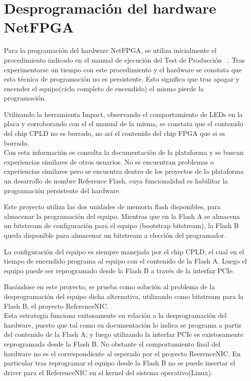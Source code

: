 \section{Desprogramaci\'on del hardware NetFPGA}
\label{apendiceB2}

Para la programación del hardware NetFPGA, se utiliza inicialmente el procedimiento indicado en el manual de ejecuci\'on del Test de Producci\'on ~\citep{ProdTestManual}. Tras experimentarse un tiempo con este procedimiento y el hardware se constata que esta técnica de programación no es persistente. Esto significa que tras apagar y encender el equipo(ciclo completo de encendido) el mismo pierde la programación. 

Utilizando la herramienta Impact, observando el comportamiento de LEDs en la placa y corroborando con el el manual de la misma, se constata que el contenido del chip CPLD no es borrado, no así el contenido del chip FPGA que si es borrado.\\

Con esta información se consulta la documentación de la plataforma y se buscan experiencias similares  de otros usuarios. No se encuentran problemas o experiencias similares pero se encuentra dentro de los proyectos de la plataforma un desarrollo de nombre Reference Flash, cuya funcionalidad es habilitar la programación persistente del hardware.

Este proyecto utiliza las dos unidades de memoria flash disponibles, para almacenar la programaci\'on del equipo. Mientras que en la Flash A se almacena un bitstream de configuración para el equipo (bootstrap bitstream), la  Flash B queda disponible para almacenar un bitstream a elección del programador. 

La configuración del equipo es siempre manejada por el chip CPLD, el cual en el tiempo de encendido programa al equipo con el contenido de la Flash A. Luego el equipo puede ser reprogramado desde la Flash B a través de la interfaz PCIe.

Basándose en este proyecto, se prueba como solución al problema de la desprogramaci\'on del equipo dicha alternativa, utilizando como bitstream para la Flash B, el proyecto ReferenceNIC.\\

Esta estrategia funciona  exitosamente en relación a la desprogramaci\'on del hardware, puesto que tal como su documentación lo indica se programa a partir del contenido de la Flash A; y luego utilizando la interfaz PCIe es existosamente reprogramada desde la Flash B. No obstante el comportamiento final del hardware no es el correspondiente al esperado por el proyecto ReerenceNIC. En particular tras reprogramar el equipo desde la Flash B no se puede insertar el driver para el ReferenceNIC en el kernel del sistema operativo(Linux).\\

